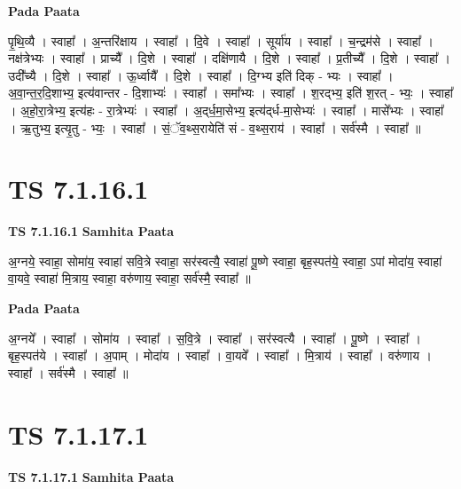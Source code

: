\documentclass[17pt]{extarticle}
\begin{document}
\textbf{Pada Paata} \newline

पृ॒थि॒व्यै । स्वाहा᳚ । अ॒न्तरि॑क्षाय । स्वाहा᳚ । दि॒वे । स्वाहा᳚ । सूर्या॑य । स्वाहा᳚ । च॒न्द्रम॑से । स्वाहा᳚ । नक्ष॑त्रेभ्यः । स्वाहा᳚ । प्राच्यै᳚ । दि॒शे । स्वाहा᳚ । दक्षि॑णायै । दि॒शे । स्वाहा᳚ । प्र॒तीच्यै᳚ । दि॒शे । स्वाहा᳚ । उदी᳚च्यै । दि॒शे । स्वाहा᳚ । ऊ॒र्ध्वायै᳚ । दि॒शे । स्वाहा᳚ । दि॒ग्भ्य इति॑ दिक् - भ्यः । स्वाहा᳚ । अ॒वा॒न्त॒र॒दि॒शाभ्य॒ इत्य॑वान्तर - दि॒शाभ्यः॑ । स्वाहा᳚ । समा᳚भ्यः । स्वाहा᳚ । श॒रद्भ्य॒ इति॑ श॒रत् - भ्यः॒ । स्वाहा᳚ । अ॒हो॒रा॒त्रेभ्य॒ इत्य॑हः - रा॒त्रेभ्यः॑ । स्वाहा᳚ । अ॒द्‌र्ध॒मा॒सेभ्य॒ इत्य॑द्‌र्ध-मा॒सेभ्यः॑ । स्वाहा᳚ । मासे᳚भ्यः । स्वाहा᳚ । ऋ॒तुभ्य॒ इत्यृ॒तु - भ्यः॒ । स्वाहा᳚ । सं॒ॅव॒थ्स॒रायेति॑ सं - व॒थ्स॒राय॑ । स्वाहा᳚ । सर्व॑स्मै । स्वाहा᳚ ॥  \newline





\section{ TS 7.1.16.1 }

\textbf{TS 7.1.16.1 } \newline
\textbf{Samhita Paata} \newline

अ॒ग्नये॒ स्वाहा॒ सोमा॑य॒ स्वाहा॑ सवि॒त्रे स्वाहा॒ सर॑स्वत्यै॒ स्वाहा॑ पू॒ष्णे स्वाहा॒ बृह॒स्पत॑ये॒ स्वाहा॒ ऽपां मोदा॑य॒ स्वाहा॑ वा॒यवे॒ स्वाहा॑ मि॒त्राय॒ स्वाहा॒ वरु॑णाय॒ स्वाहा॒ सर्व॑स्मै॒ स्वाहा᳚ ॥ \newline

\textbf{Pada Paata} \newline

अ॒ग्नये᳚ । स्वाहा᳚ । सोमा॑य । स्वाहा᳚ । स॒वि॒त्रे । स्वाहा᳚ । सर॑स्वत्यै । स्वाहा᳚ । पू॒ष्णे । स्वाहा᳚ । बृह॒स्पत॑ये । स्वाहा᳚ । अ॒पाम् । मोदा॑य । स्वाहा᳚ । वा॒यवे᳚ । स्वाहा᳚ । मि॒त्राय॑ । स्वाहा᳚ । वरु॑णाय । स्वाहा᳚ । सर्व॑स्मै । स्वाहा᳚ ॥  \newline





\section{ TS 7.1.17.1 }

\textbf{TS 7.1.17.1 } \newline
\textbf{Samhita Paata} \newline
\end{document}
